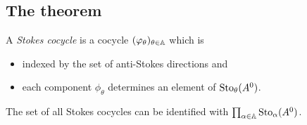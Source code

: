 \subsection{The theorem}
\begin{comment}
  \cite[Thm.6.3.1]{sibuya1990Linear} says: if two differential equations have
  the same stokes phenomenon, they are analytically equivalent.
\end{comment}
\begin{defn}

  A \emph{Stokes cocycle} is a cocycle
  $(\varphi_\theta)_{\theta\in\mathbb{A}}$ which is
  \begin{itemize}
    \item indexed by the set of anti-Stokes directions and
    \item each component $\phi_\theta$ determines an element of
      $\operatorname{Sto}_\theta(A^0)$.
  \end{itemize}
  \begin{s-rem}
    The set of all Stokes cocycles can be identified with 
    $\prod_{\alpha\in\mathbb{A}}\operatorname{Sto}_\alpha(A^0)$.
  \end{s-rem}
\end{defn}

